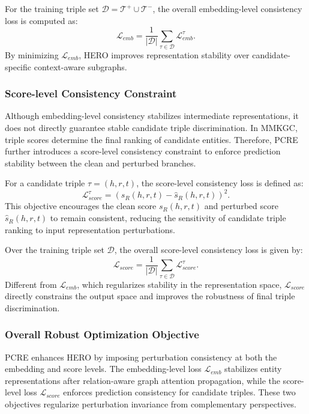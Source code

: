 \documentclass[pdflatex,sn-mathphys-num]{sn-jnl}
\begin{document}
For the training triple set $\mathcal{D}=\mathcal{T}^{+}\cup\mathcal{T}^{-}$, the overall embedding-level consistency loss is computed as:
\begin{equation}
\mathcal{L}_{emb}
=
\frac{1}{|\mathcal{D}|}
\sum_{\tau\in\mathcal{D}}
\mathcal{L}_{emb}^{\tau}.
\end{equation}
By minimizing $\mathcal{L}_{emb}$, HERO improves representation stability over candidate-specific context-aware subgraphs.

\subsubsection{Score-level Consistency Constraint}

Although embedding-level consistency stabilizes intermediate representations, it does not directly guarantee stable candidate triple discrimination. In MMKGC, triple scores determine the final ranking of candidate entities. Therefore, PCRE further introduces a score-level consistency constraint to enforce prediction stability between the clean and perturbed branches.

For a candidate triple $\tau=(h,r,t)$, the score-level consistency loss is defined as:
\begin{equation}
\mathcal{L}_{score}^{\tau}
=
\left(
s_R(h,r,t)
-
\widehat{s}_R(h,r,t)
\right)^{2}.
\end{equation}
This objective encourages the clean score $s_R(h,r,t)$ and perturbed score $\widehat{s}_R(h,r,t)$ to remain consistent, reducing the sensitivity of candidate triple ranking to input representation perturbations.

Over the training triple set $\mathcal{D}$, the overall score-level consistency loss is given by:
\begin{equation}
\mathcal{L}_{score}
=
\frac{1}{|\mathcal{D}|}
\sum_{\tau\in\mathcal{D}}
\mathcal{L}_{score}^{\tau}.
\end{equation}
Different from $\mathcal{L}_{emb}$, which regularizes stability in the representation space, $\mathcal{L}_{score}$ directly constrains the output space and improves the robustness of final triple discrimination.

\subsubsection{Overall Robust Optimization Objective}

PCRE enhances HERO by imposing perturbation consistency at both the embedding and score levels. The embedding-level loss $\mathcal{L}_{emb}$ stabilizes entity representations after relation-aware graph attention propagation, while the score-level loss $\mathcal{L}_{score}$ enforces prediction consistency for candidate triples. These two objectives regularize perturbation invariance from complementary perspectives.
\end{document}
